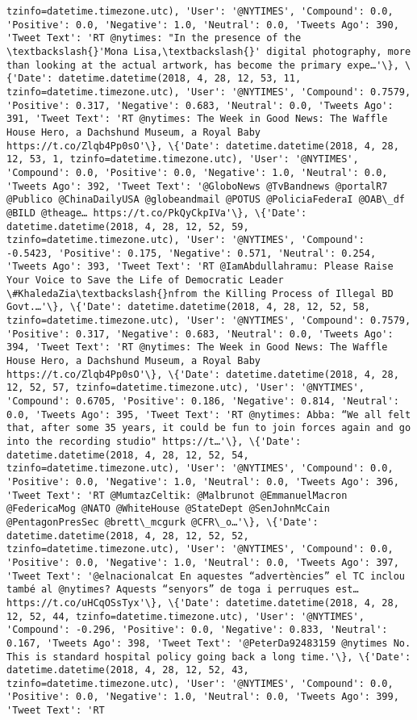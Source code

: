 \documentclass[11pt]{article}
\begin{document}
\begin{Verbatim}[commandchars=\\\{\}]
tzinfo=datetime.timezone.utc), 'User': '@NYTIMES', 'Compound': 0.0, 'Positive': 0.0, 'Negative': 1.0, 'Neutral': 0.0, 'Tweets Ago': 390, 'Tweet Text': 'RT @nytimes: "In the presence of the \textbackslash{}'Mona Lisa,\textbackslash{}' digital photography, more than looking at the actual artwork, has become the primary expe…'\}, \{'Date': datetime.datetime(2018, 4, 28, 12, 53, 11, tzinfo=datetime.timezone.utc), 'User': '@NYTIMES', 'Compound': 0.7579, 'Positive': 0.317, 'Negative': 0.683, 'Neutral': 0.0, 'Tweets Ago': 391, 'Tweet Text': 'RT @nytimes: The Week in Good News: The Waffle House Hero, a Dachshund Museum, a Royal Baby https://t.co/Zlqb4Pp0sO'\}, \{'Date': datetime.datetime(2018, 4, 28, 12, 53, 1, tzinfo=datetime.timezone.utc), 'User': '@NYTIMES', 'Compound': 0.0, 'Positive': 0.0, 'Negative': 1.0, 'Neutral': 0.0, 'Tweets Ago': 392, 'Tweet Text': '@GloboNews @TvBandnews @portalR7 @Publico @ChinaDailyUSA @globeandmail @POTUS @PoliciaFederaI @OAB\_df @BILD @theage… https://t.co/PkQyCkpIVa'\}, \{'Date': datetime.datetime(2018, 4, 28, 12, 52, 59, tzinfo=datetime.timezone.utc), 'User': '@NYTIMES', 'Compound': -0.5423, 'Positive': 0.175, 'Negative': 0.571, 'Neutral': 0.254, 'Tweets Ago': 393, 'Tweet Text': 'RT @IamAbdullahramu: Please Raise Your Voice to Save the Life of Democratic Leader \#KhaledaZia\textbackslash{}nfrom the Killing Process of Illegal BD Govt.…'\}, \{'Date': datetime.datetime(2018, 4, 28, 12, 52, 58, tzinfo=datetime.timezone.utc), 'User': '@NYTIMES', 'Compound': 0.7579, 'Positive': 0.317, 'Negative': 0.683, 'Neutral': 0.0, 'Tweets Ago': 394, 'Tweet Text': 'RT @nytimes: The Week in Good News: The Waffle House Hero, a Dachshund Museum, a Royal Baby https://t.co/Zlqb4Pp0sO'\}, \{'Date': datetime.datetime(2018, 4, 28, 12, 52, 57, tzinfo=datetime.timezone.utc), 'User': '@NYTIMES', 'Compound': 0.6705, 'Positive': 0.186, 'Negative': 0.814, 'Neutral': 0.0, 'Tweets Ago': 395, 'Tweet Text': 'RT @nytimes: Abba: “We all felt that, after some 35 years, it could be fun to join forces again and go into the recording studio" https://t…'\}, \{'Date': datetime.datetime(2018, 4, 28, 12, 52, 54, tzinfo=datetime.timezone.utc), 'User': '@NYTIMES', 'Compound': 0.0, 'Positive': 0.0, 'Negative': 1.0, 'Neutral': 0.0, 'Tweets Ago': 396, 'Tweet Text': 'RT @MumtazCeltik: @Malbrunot @EmmanuelMacron @FedericaMog @NATO @WhiteHouse @StateDept @SenJohnMcCain @PentagonPresSec @brett\_mcgurk @CFR\_o…'\}, \{'Date': datetime.datetime(2018, 4, 28, 12, 52, 52, tzinfo=datetime.timezone.utc), 'User': '@NYTIMES', 'Compound': 0.0, 'Positive': 0.0, 'Negative': 1.0, 'Neutral': 0.0, 'Tweets Ago': 397, 'Tweet Text': '@elnacionalcat En aquestes “advertències” el TC inclou també al @nytimes? Aquests “senyors” de toga i perruques est… https://t.co/uHCqOSsTyx'\}, \{'Date': datetime.datetime(2018, 4, 28, 12, 52, 44, tzinfo=datetime.timezone.utc), 'User': '@NYTIMES', 'Compound': -0.296, 'Positive': 0.0, 'Negative': 0.833, 'Neutral': 0.167, 'Tweets Ago': 398, 'Tweet Text': '@PeterDa92483159 @nytimes No. This is standard hospital policy going back a long time.'\}, \{'Date': datetime.datetime(2018, 4, 28, 12, 52, 43, tzinfo=datetime.timezone.utc), 'User': '@NYTIMES', 'Compound': 0.0, 'Positive': 0.0, 'Negative': 1.0, 'Neutral': 0.0, 'Tweets Ago': 399, 'Tweet Text': 'RT 
\end{Verbatim}
\end{document}
